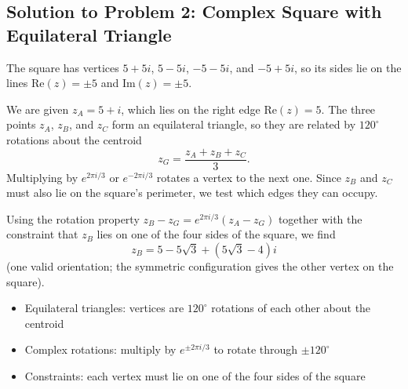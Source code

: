 \subsection{Solution to Problem 2: Complex Square with Equilateral Triangle}

\begin{solution}
The square has vertices $5+5i$, $5-5i$, $-5-5i$, and $-5+5i$, so its sides lie on the lines $\text{Re}(z)=\pm 5$ and $\text{Im}(z)=\pm 5$.

We are given $z_A = 5+i$, which lies on the right edge $\text{Re}(z)=5$. The three points $z_A$, $z_B$, and $z_C$ form an equilateral triangle, so they are related by $120^\circ$ rotations about the centroid
\[
z_G = \frac{z_A + z_B + z_C}{3}.
\]
Multiplying by $e^{2\pi i/3}$ or $e^{-2\pi i/3}$ rotates a vertex to the next one. Since $z_B$ and $z_C$ must also lie on the square's perimeter, we test which edges they can occupy.

Using the rotation property $z_B - z_G = e^{2\pi i/3}(z_A - z_G)$ together with the constraint that $z_B$ lies on one of the four sides of the square, we find
\[
z_B = 5 - 5\sqrt{3} + (5\sqrt{3} - 4)i
\]
(one valid orientation; the symmetric configuration gives the other vertex on the square).
\end{solution}

\begin{takeaways}
\begin{itemize}
    \item Equilateral triangles: vertices are $120^\circ$ rotations of each other about the centroid
    \item Complex rotations: multiply by $e^{\pm 2\pi i/3}$ to rotate through $\pm 120^\circ$
    \item Constraints: each vertex must lie on one of the four sides of the square
\end{itemize}
\end{takeaways}
